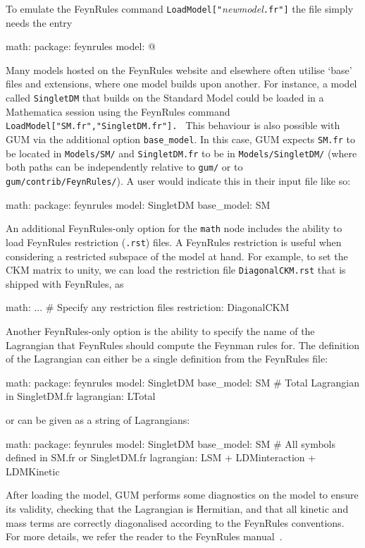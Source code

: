 \documentclass[pdftex,twocolumn,epjc3_preprint,runningheads]{svjour3}
\renewcommand{\_}{\discretionary{\underscore}{}{\underscore}}
\newcommand\yaml[1]{{\lstset{style=yaml}\lstinline!#1!\lstset{style=cpp}}}
\newcommand\term[1]{{\lstset{style=terminal}\lstinline!#1!\lstset{style=cpp}}}
\newcommand\mathematica[1]{{\lstset{style=Mathematica}\lstinline!#1!\lstset{style=cpp}}}
\newcommand\guminline[1]{{{\lstset{style=gum}\lstinline!#1!}}}
\newcommand{\metavarf}[1]{\textit{\color{darkgreen}\footnotesize\textrm{#1}}}
\newcommand{\metavar}{\metavarf}
\newcommand\Mathematica{\textsf{Mathematica}\xspace}
\newcommand{\gum}{\textsf{GUM}\xspace}
\newcommand{\dgum}{\!\!\term{.gum}\!\xspace}
\newcommand{\fr}{\textsf{FeynRules}\xspace}
\newcommand{\nm}{\metavar{new\_model}}
\begin{document}
To emulate the \fr command
%
\mathematica{LoadModel["}\nm\mathematica{.fr"}\term{]}
%
the \dgum file simply needs the entry
\begin{lstgum}
math:
  package: feynrules
  model: @\nm@
\end{lstgum}

Many models hosted on the \fr website and elsewhere often utilise `base' files and extensions, where one model builds upon another. For instance, a model called \yaml{SingletDM} that builds on the Standard Model could be loaded in a \Mathematica session using the \fr command
%
\mathematica{
LoadModel["SM.fr","SingletDM.fr"].
}
%
This behaviour is also possible with \gum via the additional option \guminline{base_model}. In this case, \gum expects \term{SM.fr} to be located in \term{Models/SM/} and \term{SingletDM.fr} to be in \term{Models/SingletDM/} (where both paths can be independently relative to \term{gum/} or to \term{gum/contrib/FeynRules/}). A user would indicate this in their input file like so:
%
\begin{lstgum}
math:
  package: feynrules
  model: SingletDM
  base_model: SM
\end{lstgum}

An additional \fr-only option for the \guminline{math} node includes the ability to load \fr restriction (\term{.rst}) files.  A \fr restriction is useful when considering a restricted subspace of the model at hand. For example, to set the CKM matrix to unity, we can load the restriction file \term{DiagonalCKM.rst} that is shipped with \fr, as
%
\begin{lstgum}
math:
  ...
  # Specify any restriction files
  restriction: DiagonalCKM
\end{lstgum}
%
Another \fr-only option is the ability to specify the name of the Lagrangian that \fr should compute the Feynman rules for. The definition of the Lagrangian can either be a single definition from the \fr file:
%
\begin{lstgum}
math:
  package: feynrules
  model: SingletDM
  base_model: SM
  # Total Lagrangian in SingletDM.fr
  lagrangian: LTotal
\end{lstgum}
%
or can be given as a string of Lagrangians:
%
\begin{lstgum}
math:
  package: feynrules
  model: SingletDM
  base_model: SM
  # All symbols defined in SM.fr or SingletDM.fr
  lagrangian: LSM + LDMinteraction + LDMKinetic
\end{lstgum}
%

After loading the model, \gum performs some diagnostics on the model to ensure its validity, checking that the Lagrangian is Hermitian, and that all kinetic and mass terms are correctly diagonalised according to the \fr conventions. For more details, we refer the reader to the \fr manual~\cite{Alloul:2013bka}.
\end{document}

